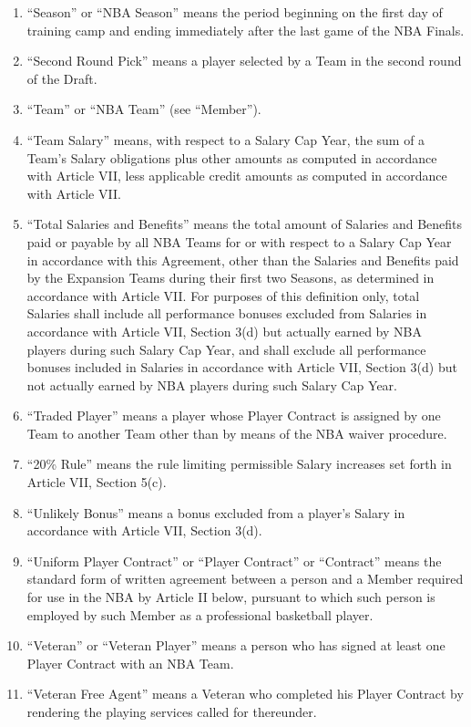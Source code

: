 \documentclass[
]{book}
\begin{document}
\begin{enumerate}
\item
  ``Season'' or ``NBA Season'' means the period beginning on the first day of training camp and ending immediately after the last game of the NBA Finals.
\item
  ``Second Round Pick'' means a player selected by a Team in the second round of the Draft.
\item
  ``Team'' or ``NBA Team'' (see ``Member'').
\item
  ``Team Salary'' means, with respect to a Salary Cap Year, the sum of a Team's Salary obligations plus other amounts as computed in accordance with Article VII, less applicable credit amounts as computed in accordance with Article VII.
\item
  ``Total Salaries and Benefits'' means the total amount of Salaries and Benefits paid or payable by all NBA Teams for or with respect to a Salary Cap Year in accordance with this Agreement, other than the Salaries and Benefits paid by the Expansion Teams during their first two Seasons, as determined in accordance with Article VII. For purposes of this definition only, total Salaries shall include all performance bonuses excluded from Salaries in accordance with Article VII, Section 3(d) but actually earned by NBA players during such Salary Cap Year, and shall exclude all performance bonuses included in Salaries in accordance with Article VII, Section 3(d) but not actually earned by NBA players during such Salary Cap Year.
\item
  ``Traded Player'' means a player whose Player Contract is assigned by one Team to another Team other than by means of the NBA waiver procedure.
\item
  ``20\% Rule'' means the rule limiting permissible Salary increases set forth in Article VII, Section 5(c).
\item
  ``Unlikely Bonus'' means a bonus excluded from a player's Salary in accordance with Article VII, Section 3(d).
\item
  ``Uniform Player Contract'' or ``Player Contract'' or ``Contract'' means the standard form of written agreement between a person and a Member required for use in the NBA by Article II below, pursuant to which such person is employed by such Member as a professional basketball player.
\item
  ``Veteran'' or ``Veteran Player'' means a person who has signed at least one Player Contract with an NBA Team.
\item
  ``Veteran Free Agent'' means a Veteran who completed his Player Contract by rendering the playing services called for thereunder.
\end{enumerate}
\end{document}
